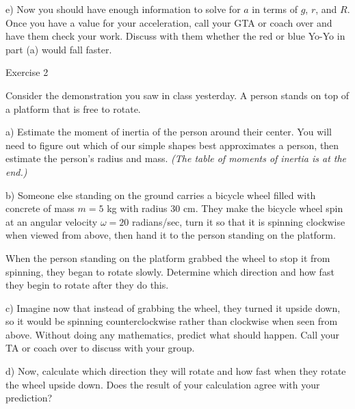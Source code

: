\documentclass[12pt]{article}
\begin{document}
\vspace{1in}

e) Now you should have enough information to solve for $a$ in terms of $g$, $r$, and $R$. Once you have a value for your acceleration, call your GTA or coach over and have them check your work. Discuss with them whether the red or blue Yo-Yo in part (a) would fall faster. 

\newpage

\begin{center}
	\Large Exercise 2
\end{center}

Consider the demonstration you saw in class yesterday. A person stands on top of a platform that is free to rotate.

a) Estimate the moment of inertia of the person around their center. You will need to figure out which of our simple shapes best approximates a person, then estimate the person's radius and mass. \textit{(The table of moments of inertia is at the end.)}

\vspace{1in}

b) Someone else standing on the ground carries a bicycle wheel filled with concrete of mass $m=5$ kg with radius 30 cm. They make the bicycle wheel spin at an angular velocity $\omega = 20$ radians/sec, turn it so that it is spinning clockwise when viewed from above, then hand it to the person standing on the platform. 

When the person standing on the platform grabbed the wheel to stop it from spinning, they began to rotate slowly. Determine which direction and how fast they begin to rotate after they do this.

\vspace{3in}
\newpage

c) Imagine now that instead of grabbing the wheel, they turned it upside down, so it would be spinning counterclockwise rather than clockwise when seen from above. Without doing any mathematics, predict what should happen. Call your TA or coach over to discuss with your group.

\vspace{2in}

d) Now, calculate which direction they will rotate and how fast when they rotate the wheel upside down. Does the result of your calculation agree with your prediction?
\vspace{3in}
\end{document}
